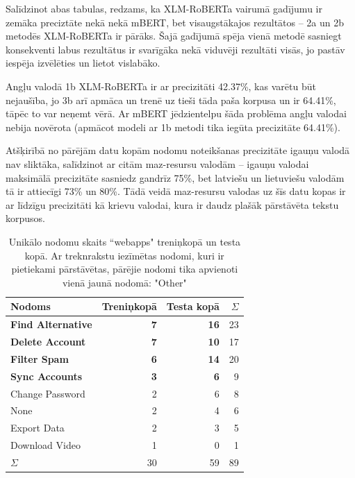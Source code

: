 Salīdzinot abas tabulas, redzams, ka XLM-RoBERTa vairumā gadījumu ir zemāka preciztāte nekā nekā mBERT, bet visaugstākajos rezultātos -- 2a un 2b metodēs XLM-RoBERTa ir pārāks. Šajā gadījumā spēja vienā metodē sasniegt konsekventi labus rezultātus ir svarīgāka nekā viduvēji rezultāti visās, jo pastāv iespēja izvēlēties un lietot vislabāko.

Angļu valodā 1b XLM-RoBERTa ir ar precizitāti 42.37\%, kas varētu būt nejaušība, jo 3b arī apmāca un trenē uz tieši tāda paša korpusa un ir 64.41\%, tāpēc to var neņemt vērā. Ar mBERT jēdzientelpu šāda problēma angļu valodai nebija novērota (apmācot modeli ar 1b metodi tika iegūta precizitāte 64.41\%).

Atšķirībā no pārējām datu kopām nodomu noteikšanas precizitāte igauņu valodā nav sliktāka, salīdzinot ar citām maz-resursu valodām -- igauņu valodai maksimālā precizitāte sasniedz gandrīz 75\%, bet latviešu un lietuviešu valodām tā ir attiecīgi 73\% un 80\%. Tādā veidā maz-resursu valodas uz šīs datu kopas ir ar līdzīgu precizitāti kā krievu valodai, kura ir daudz plašāk pārstāvēta tekstu korpusos.






\begin{table}[htbp]
  \centering
  \caption{Unikālo nodomu skaits ``webapps" treniņkopā un testa kopā. Ar treknrakstu iezīmētas nodomi, kuri ir pietiekami pārstāvētas, pārējie nodomi tika apvienoti vienā jaunā nodomā: "Other"}
    \begin{tabular}{lrrr} \toprule
    Nodoms & Treniņkopā & Testa kopā & $\Sigma$ \\\midrule
    \textbf{Find Alternative} & \textbf{7} & \textbf{16} & 23\\
    \textbf{Delete Account} & \textbf{7} & \textbf{10} & 17\\
    \textbf{Filter Spam} & \textbf{6} & \textbf{14} & 20 \\
    \textbf{Sync Accounts} & \textbf{3} & \textbf{6} & 9 \\
    Change Password & 2     & 6 & 8\\
    None  & 2     & 4 & 6\\
    Export Data & 2     & 3 & 5 \\
    Download Video & 1     & 0 & 1\\
    $\Sigma$ & 30    & 59 & 89 \\\bottomrule
    \end{tabular}%
  \label{tab:webapps-labels}%
\end{table}%


